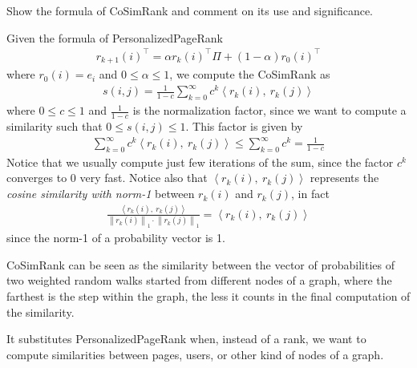 \exercise

Show the formula of CoSimRank and comment on its use and significance.

\solution

Given the formula of PersonalizedPageRank
%
\begin{align*}
  r_{k+1}(i)^\top = \alpha r_k(i)^\top \Pi + (1 - \alpha)r_0(i)^\top
\end{align*}
%
where $r_0(i) = e_i$ and $0 \le \alpha \le 1$, we compute the CoSimRank as
%
\begin{align*}
  s(i, j) = \frac{1}{1 - c} \sum\limits_{k = 0}^\infty c^k \left\langle r_k(i),\
  r_k(j) \right\rangle
\end{align*}
%
where $0 \le c \le 1$ and $\frac{1}{1 - c}$ is the normalization factor, since
we want to compute a similarity such that $0 \le s(i, j) \le 1$. This factor is
given by
%
\begin{align*}
  \sum\limits_{k = 0}^\infty c^k \left\langle r_k(i),\ r_k(j) \right\rangle \le
  \sum\limits_{k = 0}^\infty c^k = \frac{1}{1 - c}
\end{align*}
%
Notice that we usually compute just few iterations of the sum, since the factor
$c^k$ converges to 0 very fast. Notice also that $\left\langle r_k(i),\ r_k(j)
\right\rangle$ represents the \emph{cosine similarity with norm-1} between
$r_k(i)$ and $r_k(j)$, in fact
%
\begin{align*}
  \frac{\left\langle r_k(i),\ r_k(j) \right\rangle}{\left\lVert r_k(i)
  \right\rVert_1 \cdot \left\lVert r_k(j) \right\rVert_1} = \left\langle
  r_k(i),\ r_k(j) \right\rangle
\end{align*}
%
since the norm-1 of a probability vector is 1.

CoSimRank can be seen as the similarity between the vector of probabilities of
two weighted random walks started from different nodes of a graph, where the
farthest is the step within the graph, the less it counts in the final
computation of the similarity.

It substitutes PersonalizedPageRank when, instead of a rank, we want to compute
similarities between pages, users, or other kind of nodes of a graph.
